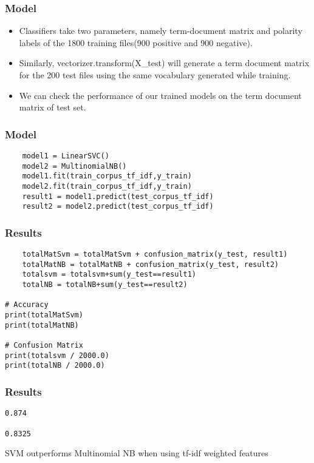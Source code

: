 \begin{frame}[fragile]\frametitle{Model}
  \begin{itemize}
  \item  Classifiers take two parameters, namely term-document matrix and polarity labels of the 1800 training files(900 positive and 900 negative). 
  \item  Similarly, vectorizer.transform(X\_test) will generate a term document matrix for the 200 test files using the same vocabulary generated while training. 
  \item We can check the performance of our trained models on the term document matrix of test set. 
  \end{itemize}
\end{frame}


\begin{frame}[fragile]\frametitle{Model}
    \begin{lstlisting}
    model1 = LinearSVC()
    model2 = MultinomialNB()    
    model1.fit(train_corpus_tf_idf,y_train)
    model2.fit(train_corpus_tf_idf,y_train)
    result1 = model1.predict(test_corpus_tf_idf)
    result2 = model2.predict(test_corpus_tf_idf)
    \end{lstlisting}
\end{frame}

\begin{frame}[fragile]\frametitle{Results}
    \begin{lstlisting}
    totalMatSvm = totalMatSvm + confusion_matrix(y_test, result1)
    totalMatNB = totalMatNB + confusion_matrix(y_test, result2)
    totalsvm = totalsvm+sum(y_test==result1)
    totalNB = totalNB+sum(y_test==result2)
    
# Accuracy
print(totalMatSvm)
print(totalMatNB)

# Confusion Matrix
print(totalsvm / 2000.0)
print(totalNB / 2000.0)
    \end{lstlisting}
\end{frame}

\begin{frame}[fragile]\frametitle{Results}
    \begin{lstlisting}
0.874

0.8325
    \end{lstlisting}
 SVM outperforms Multinomial NB when using tf-idf weighted features
\end{frame}

